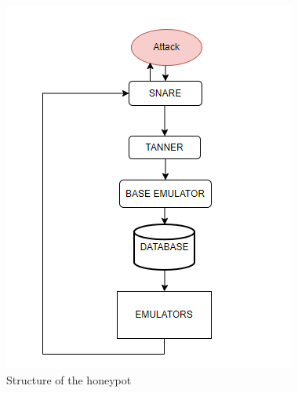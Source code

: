 \begin{figure}[h!]
  \centering
  \includegraphics{images/solution.png}
  \caption{Structure of the honeypot}
  \label{fig:irradiances}
\end{figure}
\FloatBarrier
